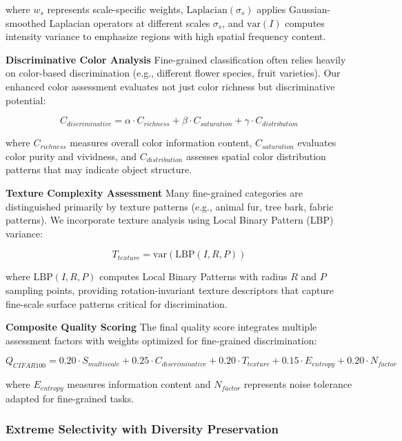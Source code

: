 \documentclass[12pt]{article}
\begin{document}
where $w_s$ represents scale-specific weights, $\text{Laplacian}(\sigma_s)$ applies Gaussian-smoothed Laplacian operators at different scales $\sigma_s$, and $\text{var}(I)$ computes intensity variance to emphasize regions with high spatial frequency content.

\textbf{Discriminative Color Analysis}
Fine-grained classification often relies heavily on color-based discrimination (e.g., different flower species, fruit varieties). Our enhanced color assessment evaluates not just color richness but discriminative potential:

\begin{equation}
C_{discriminative} = \alpha \cdot C_{richness} + \beta \cdot C_{saturation} + \gamma \cdot C_{distribution}
\end{equation}

where $C_{richness}$ measures overall color information content, $C_{saturation}$ evaluates color purity and vividness, and $C_{distribution}$ assesses spatial color distribution patterns that may indicate object structure.

\textbf{Texture Complexity Assessment}
Many fine-grained categories are distinguished primarily by texture patterns (e.g., animal fur, tree bark, fabric patterns). We incorporate texture analysis using Local Binary Pattern (LBP) variance:

\begin{equation}
T_{texture} = \text{var}(\text{LBP}(I, R, P))
\end{equation}

where $\text{LBP}(I, R, P)$ computes Local Binary Patterns with radius $R$ and $P$ sampling points, providing rotation-invariant texture descriptors that capture fine-scale surface patterns critical for discrimination.

\textbf{Composite Quality Scoring}
The final quality score integrates multiple assessment factors with weights optimized for fine-grained discrimination:

\begin{equation}
Q_{CIFAR100} = 0.20 \cdot S_{multiscale} + 0.25 \cdot C_{discriminative} + 0.20 \cdot T_{texture} + 0.15 \cdot E_{entropy} + 0.20 \cdot N_{factor}
\end{equation}

where $E_{entropy}$ measures information content and $N_{factor}$ represents noise tolerance adapted for fine-grained tasks.

\subsubsection{Extreme Selectivity with Diversity Preservation}\label{extreme-selectivity}
\end{document}
